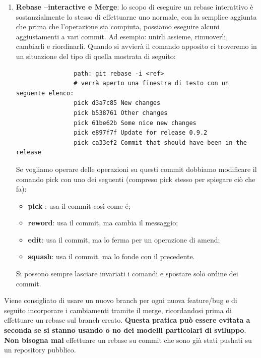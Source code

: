 \begin{enumerate}
				\item \textbf{Rebase --interactive e Merge}: lo scopo di eseguire un rebase interattivo è sostanzialmente lo stesso di effettuarne uno normale, con la semplice aggiunta che prima che l'operazione sia compiuta, possiamo eseguire alcuni aggiustamenti a vari commit. Ad esempio: unirli assieme, rimuoverli, cambiarli e riordinarli. \newline
				Quando si avvierà il comando apposito ci troveremo in un situazione del tipo di quella mostrata di seguito:
				\begin{verbatim}
				path: git rebase -i <ref>
				# verrà aperto una finestra di testo con un seguente elenco:
				pick d3a7c85 New changes
				pick b538761 Other changes
				pick 61be62b Some nice new changes
				pick e897f7f Update for release 0.9.2
				pick ca33ef2 Commit that should have been in the release
				\end{verbatim}
				Se vogliamo operare delle operazioni su questi commit dobbiamo modificare il comando pick con uno dei seguenti (compreso pick stesso per spiegare ciò che fa):
					\begin{itemize}
						\item \textbf{pick} : usa il commit così come é;
						\item \textbf{reword}: usa il commit, ma cambia il messaggio;
						\item \textbf{edit}: usa il commit, ma lo ferma per un operazione di amend;
						\item \textbf{squash}: usa il commit, ma lo fonde con il precedente.
					\end{itemize}
					\noindent
				Si possono sempre lasciare invariati i comandi e spostare solo ordine dei commit.

			\end{enumerate}
			\noindent
		Viene consigliato di usare un nuovo branch per ogni nuova feature/bug e di seguito incorporare i cambiamenti tramite il merge, ricordandosi prima di effettuare un rebase sul branch creato. \textbf{Questa pratica può essere evitata a seconda se si stanno usando o no dei modelli particolari di sviluppo}. \newline
		\textbf{Non bisogna mai} effettuare un rebase su commit che sono già stati pushati su un repository pubblico.

